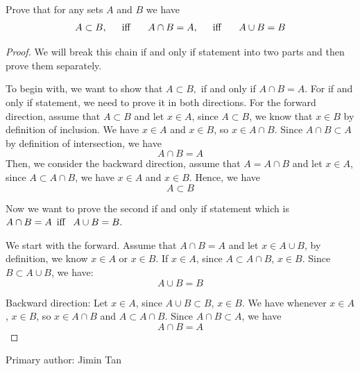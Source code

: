 \begin{minorEx}%
    Prove that for any sets $A$ and $B$ we have 
    $$
    A \subset B, \hspace{15pt} \text{\normalfont iff } \hspace{15pt} A \cap B =
    A, \hspace{15pt} \text{\normalfont iff } \hspace{15pt} A \cup B = B
    $$
\end{minorEx}

\begin{proof}
            We will break this chain if and only if statement into two parts and then prove them separately.
            
            To begin with, we want to show that $A \subset B, $  if and only if $A \cap B = A$.
            For if and only if statement, we need to prove it in both directions. For the forward direction, assume that $A \subset B$ and let $x \in A$, since $A \subset B$, we know that $x \in B$ by definition of inclusion. We have $x \in A$ and $x \in B$, so $x \in A \cap B$. Since $A \cap B \subset A$ by definition of intersection, we have $$A \cap B = A$$
            Then, we consider the backward direction, assume that $A = A \cap B$ and let $x \in A$, since $A \subset A \cap B$, we have $x \in A$ and $x \in B$. Hence, we have $$A \subset B$$
            
            Now we want to prove the second if and only if statement which is $A \cap B = A \hspace{5pt} \text{\normalfont iff } \hspace{5pt} A \cup B = B.$ 
            
            We start with the forward. Assume that $A \cap B = A$ and let $x \in A \cup B$, by definition, we know $x \in A$ or $x \in B$. If $x \in A$, since $A \subset A \cap B$, $x \in B$. Since $B \subset A \cup B$, we have: $$A \cup B = B$$
            
            Backward direction:
            Let $x \in A$, since $A \cup B \subset B$, $x \in B$. We have whenever $x \in A$, $x \in B$, so $x \in A \cap B$ and $A \subset A \cap B$. Since $A \cap B \subset A$, we have $$A \cap B = A$$
            \end{proof} 
                    Primary author: Jimin Tan

